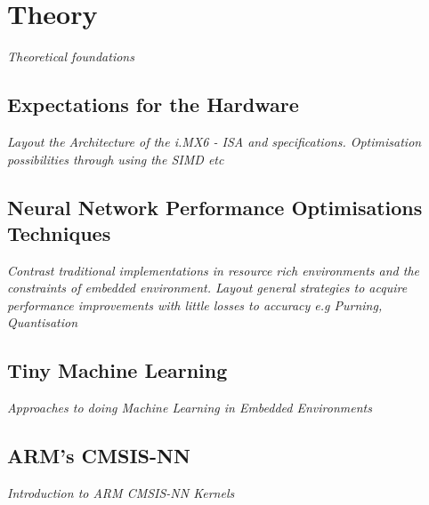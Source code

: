 \chapter{Theory}
\textit{Theoretical foundations}

\section{Expectations for the Hardware}
\textit{Layout the Architecture of the i.MX6 - ISA and specifications. Optimisation possibilities through using the SIMD etc}

\section{Neural Network Performance Optimisations Techniques}
\textit{Contrast traditional implementations in resource rich environments and the constraints of embedded environment. Layout general strategies to acquire performance improvements with little losses to accuracy e.g Purning, Quantisation}

\section{Tiny Machine Learning}
\textit{Approaches to doing Machine Learning in Embedded Environments}

\section{ARM's CMSIS-NN}
\textit{Introduction to ARM CMSIS-NN Kernels}
